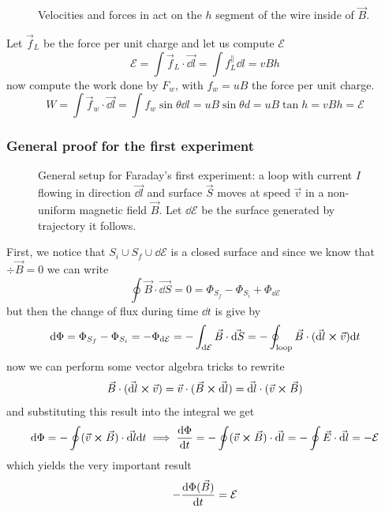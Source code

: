 \documentclass[12pt]{extarticle}
\begin{document}
\begin{figure}[H]
	\centering
	
	\caption{Velocities and forces in act on the $h$ segment of the wire inside of $\vec B$.}
\end{figure}

Let $\vec f_L$ be the force per unit charge and let us compute $\mathcal{E}$
\begin{equation}
	\mathcal{E} = \int \vec f_L \cdot \vec{\dd l } = \int f_L^{\parallel} \dd l = v B h
\end{equation}
now compute the work done by $F_w$, with $f_w = u B$ the force per unit charge.
\begin{equation}
	W = \int \vec f_w \cdot \vec{\dd l } = \int f_w \sin \theta \dd l = u B \sin \theta d = u B \tan h = v B h = \mathcal{E}
\end{equation}

\subsubsection{General proof for the first experiment}

\begin{figure}[H]
	\centering
	
	\caption{General setup for Faraday's first experiment: a loop with current $I$ flowing in direction $\vec {\dd l}$
		and surface $\vec S$ moves at speed $\vec v$ in a non-uniform magnetic field $\vec B$.
		Let $\dd \mathcal{E}$ be the surface generated by trajectory it follows.}
\end{figure}

First, we notice that $S_i \cup S_f \cup \dd \mathcal{E}$ is a closed surface and since we know that $\div \vec B = 0$
we can write
\begin{equation}
	\oint \vec B \cdot \vec{\dd S } = 0 = \Phi_{S_f} - \Phi_{S_i} + \Phi_{\dd \mathcal{E}}
\end{equation}
but then the change of flux during time $\dd t$ is give by
\begin{equation}
	\dd \Phi = \Phi_{S_f} - \Phi_{S_i} = - \Phi_{\dd \mathcal{E}}
	= - \int_{\dd \mathcal{E}} \vec B \cdot \vec{\dd S}
	= -\oint_\text{loop} \vec B \cdot (\vec{\dd l} \cross \vec v) \dd t
\end{equation}
now we can perform some vector algebra tricks to rewrite
\begin{equation}
	\vec B \cdot (\vec {\dd l} \cross \vec v) = \vec v \cdot (\vec B \cross \vec{\dd l})
	= \vec{\dd l} \cdot (\vec v \cross \vec B)
\end{equation}
and substituting this result into the integral we get
\begin{equation}
	\dd \Phi = - \oint (\vec v \cross \vec B ) \cdot \vec{\dd l} \dd t
	\implies \dv{\Phi}{t} = - \oint (\vec v \cross \vec B) \cdot \vec{\dd l}
	= - \oint \vec E \cdot \vec{\dd l} = -\mathcal{E}
\end{equation}
which yields the very important result
\begin{equation}
	- \dv{\Phi(\vec B)}{t} = \mathcal{E}
\end{equation}
\end{document}
